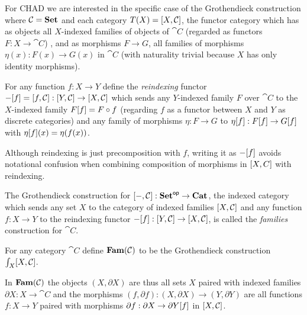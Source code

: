 For CHAD we are interested in the specific case of the Grothendieck construction where $\mathcal{C} = \mathbf{Set}$ and
each category $T(X) = [X,\mathcal{C}]$, the functor category which has as objects all $X$-indexed families
of objects of $\cat{C}$ (regarded as functors $F: X \to \cat{C}$) , and as morphisms $F \to G$, all families
of morphisms $\eta(x): F(x) \to G(x)$ in $\cat{C}$ (with naturality trivial because $X$ has only identity
morphisms).

%

\begin{definition}[Reindexing]
For any function $f: X \to Y$ define the \emph{reindexing} functor $-[f] = [f,\mathcal{C}]:
[Y,\mathcal{C}] \to [X,\mathcal{C}]$ which sends any $Y$-indexed family $F$ over $\cat{C}$ to the
$X$-indexed family $F[f] = F \circ f$ (regarding $f$ as a functor between $X$ and $Y$ as discrete
categories) and any family of morphisms $\eta: F \to G$ to $\eta[f]: F[f] \to
G[f]$ with $\eta[f](x) = \eta(f(x))$.
\end{definition}

\noindent Although reindexing is just precomposition with $f$, writing it as $-[f]$ avoids
notational confusion when combining composition of morphisms in $[X,C]$ with reindexing.

The Grothendieck construction for $[-,\mathcal{C}]: \mathbf{Set}^{\mathsf{op}} \to \mathbf{Cat}$, the indexed category which sends
any set $X$ to the category of indexed families $[X,\mathcal{C}]$ and any function $f: X \to Y$ to the
reindexing functor $-[f]: [Y,\mathcal{C}] \to [X,\mathcal{C}]$, is called the \emph{families}
construction for $\cat{C}$.

\begin{definition}
\label{def:Fam}
For any category $\cat{C}$ define $\mathbf{Fam}(\mathcal{C})$ to be the Grothendieck construction
$\int_{X}[X,\mathcal{C}]$.
\end{definition}

\noindent In $\mathbf{Fam}(\mathcal{C})$ the objects $(X, \partial X)$ are thus all sets $X$ paired with indexed families
$\partial X: X \to \cat{C}$ and the morphisms $(f, \partial f): (X, \partial X) \to (Y, \partial Y)$ are all
functions $f: X \to Y$ paired with morphisms $\partial f: \partial X \to \partial Y[f]$ in
$[X,\mathcal{C}]$.

